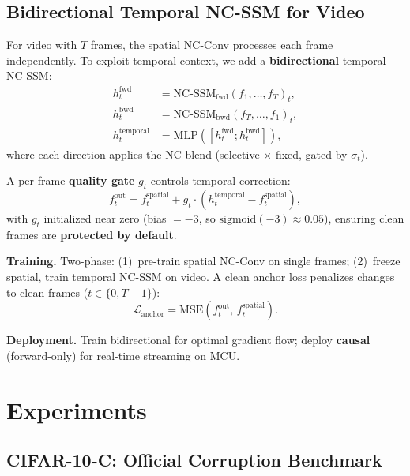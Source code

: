 \documentclass[runningheads]{llncs}
\begin{document}
\subsection{Bidirectional Temporal NC-SSM for Video}
\label{sec:temporal_theory}

For video with $T$ frames, the spatial NC-Conv processes each frame independently.
To exploit temporal context, we add a \textbf{bidirectional} temporal NC-SSM:
\begin{align}
h_t^{\text{fwd}} &= \text{NC-SSM}_{\text{fwd}}(f_1, \ldots, f_T)_t, \\
h_t^{\text{bwd}} &= \text{NC-SSM}_{\text{bwd}}(f_T, \ldots, f_1)_t, \\
h_t^{\text{temporal}} &= \text{MLP}([h_t^{\text{fwd}}; h_t^{\text{bwd}}]),
\end{align}
where each direction applies the NC blend (selective $\times$ fixed, gated by $\sigma_t$).

A per-frame \textbf{quality gate} $g_t$ controls temporal correction:
\begin{equation}
f_t^{\text{out}} = f_t^{\text{spatial}} + g_t \cdot (h_t^{\text{temporal}} - f_t^{\text{spatial}}),
\end{equation}
with $g_t$ initialized near zero (bias $= -3$, so $\text{sigmoid}(-3) \approx 0.05$), ensuring clean frames are \textbf{protected by default}.

\noindent\textbf{Training.}
Two-phase: (1)~pre-train spatial NC-Conv on single frames; (2)~freeze spatial, train temporal NC-SSM on video.
A clean anchor loss penalizes changes to clean frames ($t \in \{0, T{-}1\}$):
\begin{equation}
\mathcal{L}_{\text{anchor}} = \text{MSE}(f_t^{\text{out}},\, f_t^{\text{spatial}}).
\end{equation}

\noindent\textbf{Deployment.}
Train bidirectional for optimal gradient flow; deploy \textbf{causal} (forward-only) for real-time streaming on MCU.


\section{Experiments}
\label{sec:experiments}

\subsection{CIFAR-10-C: Official Corruption Benchmark}
\label{sec:cifar10c}
\end{document}
